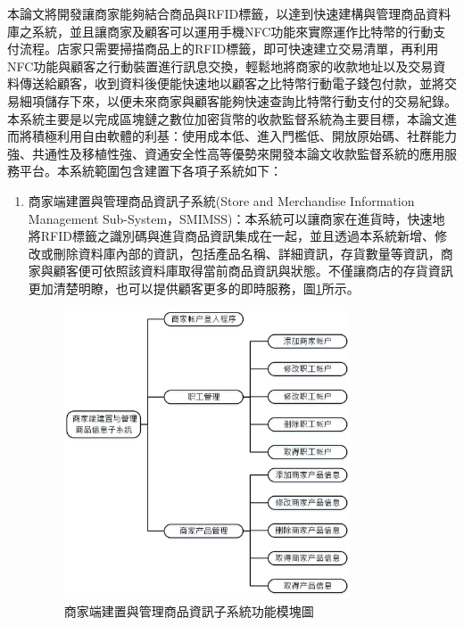 	本論文將開發讓商家能夠結合商品與RFID標籤，以達到快速建構與管理商品資料庫之系統，並且讓商家及顧客可以運用手機NFC功能來實際運作比特幣的行動支付流程。店家只需要掃描商品上的RFID標籤，即可快速建立交易清單，再利用NFC功能與顧客之行動裝置進行訊息交換，輕鬆地將商家的收款地址以及交易資料傳送給顧客，收到資料後便能快速地以顧客之比特幣行動電子錢包付款，並將交易細項儲存下來，以便未來商家與顧客能夠快速查詢比特幣行動支付的交易紀錄。
	本系統主要是以完成區塊鏈之數位加密貨幣的收款監督系統為主要目標，本論文進而將積極利用自由軟體的利基：使用成本低、進入門檻低、開放原始碼、社群能力強、共通性及移植性強、資通安全性高等優勢來開發本論文收款監督系統的應用服務平台。本系統範圍包含建置下各項子系統如下：
		\begin{enumerate}
		\item 商家端建置與管理商品資訊子系統(Store and Merchandise Information Management Sub-System，SMIMSS)：本系統可以讓商家在進貨時，快速地將RFID標籤之識別碼與進貨商品資訊集成在一起，並且透過本系統新增、修改或刪除資料庫內部的資訊，包括產品名稱、詳細資訊，存貨數量等資訊，商家與顧客便可依照該資料庫取得當前商品資訊與狀態。不僅讓商店的存貨資訊更加清楚明瞭，也可以提供顧客更多的即時服務，圖\ref{model1}所示。

			\begin{figure}[!htbp]
			\centering
			\includegraphics[width = 0.8\textwidth]{model1.jpg}
			\caption{商家端建置與管理商品資訊子系統功能模塊圖}\label{model1}
			\end{figure}




\end{enumerate}
